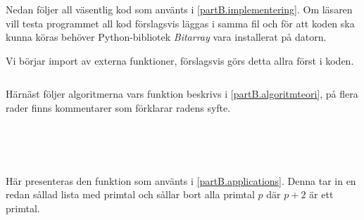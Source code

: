 \newcommand{\code}[1]{\inputminted[frame=lines,fontsize=\footnotesize,linenos]{python}{code/#1.py}}

Nedan följer all väsentlig kod som använts i \ref{partB.implementering}.
Om läsaren vill testa programmet all kod förslagsvis läggas i samma fil och för att koden ska kunna köras behöver Python-bibliotek \textit{Bitarray} vara installerat på datorn.

Vi börjar import av externa funktioner, förslagsvis görs detta allra först i koden.
\code{imports}

Härnäst följer algoritmerna vars funktion beskrivs i \ref{partB.algoritmteori}, 
på flera rader finns kommentarer som förklarar radens syfte.
\code{SimpleSiev} %
\code{SimpleSegSiev} %
\code{SubSegSiev} %
\code{NewSegSiev} %
\code{DiophAppr} %

Här presenteras den funktion som använts i \ref{partB.applications}.
Denna tar in en redan sållad lista med primtal och sållar bort alla primtal $p$ där $p+2$ är ett primtal.
\code{RemoveNonTwins}
